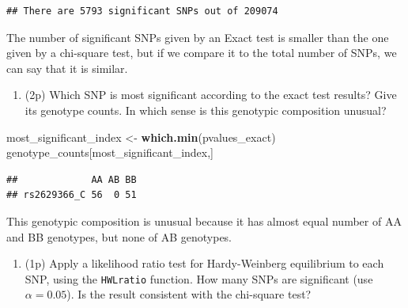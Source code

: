 \documentclass[
]{article}
\newenvironment{Shaded}{\begin{snugshade}}{\end{snugshade}}
\newcommand{\ControlFlowTok}[1]{\textcolor[rgb]{0.13,0.29,0.53}{\textbf{#1}}}
\newcommand{\DataTypeTok}[1]{\textcolor[rgb]{0.13,0.29,0.53}{#1}}
\newcommand{\DecValTok}[1]{\textcolor[rgb]{0.00,0.00,0.81}{#1}}
\newcommand{\FloatTok}[1]{\textcolor[rgb]{0.00,0.00,0.81}{#1}}
\newcommand{\KeywordTok}[1]{\textcolor[rgb]{0.13,0.29,0.53}{\textbf{#1}}}
\newcommand{\NormalTok}[1]{#1}
\newcommand{\OperatorTok}[1]{\textcolor[rgb]{0.81,0.36,0.00}{\textbf{#1}}}
\newcommand{\OtherTok}[1]{\textcolor[rgb]{0.56,0.35,0.01}{#1}}
\newcommand{\StringTok}[1]{\textcolor[rgb]{0.31,0.60,0.02}{#1}}
\providecommand{\tightlist}{%
  \setlength{\itemsep}{0pt}\setlength{\parskip}{0pt}}
\begin{document}
\begin{verbatim}
## There are 5793 significant SNPs out of 209074
\end{verbatim}

The number of significant SNPs given by an Exact test is smaller than
the one given by a chi-square test, but if we compare it to the total
number of SNPs, we can say that it is similar.

\begin{enumerate}
\def\labelenumi{\arabic{enumi}.}
\setcounter{enumi}{8}
\tightlist
\item
  (2p) Which SNP is most significant according to the exact test
  results? Give its genotype counts. In which sense is this genotypic
  composition unusual?
\end{enumerate}

\begin{Shaded}
\begin{Highlighting}[]
\NormalTok{most_significant_index <-}\StringTok{ }\KeywordTok{which.min}\NormalTok{(pvalues_exact)}
\NormalTok{genotype_counts[most_significant_index,]}
\end{Highlighting}
\end{Shaded}

\begin{verbatim}
##             AA AB BB
## rs2629366_C 56  0 51
\end{verbatim}

This genotypic composition is unusual because it has almost equal number
of AA and BB genotypes, but none of AB genotypes.

\begin{enumerate}
\def\labelenumi{\arabic{enumi}.}
\setcounter{enumi}{9}
\tightlist
\item
  (1p) Apply a likelihood ratio test for Hardy-Weinberg equilibrium to
  each SNP, using the \texttt{HWLratio} function. How many SNPs are
  significant (use \(\alpha = 0.05\)). Is the result consistent with the
  chi-square test?
\end{enumerate}

\begin{Shaded}
\end{Shaded}
\end{document}
